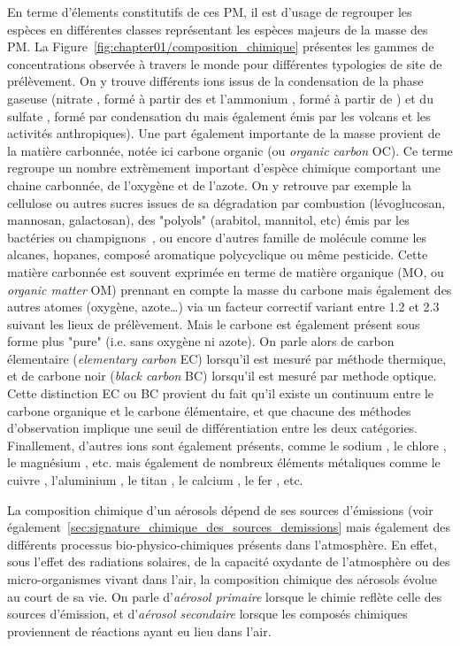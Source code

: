 En terme d'élements constitutifs de ces PM, il est d'usage de regrouper les espèces en
différentes classes représentant les espèces majeurs de la masse des PM. La
Figure~\ref{fig:chapter01/composition_chimique} présentes les gammes de concentrations
observée à travers le monde pour différentes typologies de site de prélèvement.
On y trouve différents ions issus de la condensation de la phase gaseuse (nitrate \NOt, formé à
partir des  et l'ammonium , formé à partir de ) et du sulfate
\SOq, formé par condensation du  mais également émis par les volcans et les
activités anthropiques).
Une part également importante de la masse provient de la matière carbonnée, notée ici
carbone organic (ou \textit{organic carbon} OC). Ce terme regroupe un nombre extrèmement
important d'espèce chimique comportant une chaine carbonnée, de l'oxygène et
de l'azote. On y retrouve par exemple la cellulose ou autres sucres issues de sa
dégradation par combustion (lévoglucosan, mannosan, galactosan), des "polyols" (arabitol,
mannitol, etc) émis par les bactéries ou champignons~\autocite{samakePolyols2019}, ou encore
d'autres famille de molécule comme les alcanes, hopanes, composé aromatique polycyclique
ou même pesticide. Cette matière carbonnée est souvent exprimée en terme de matière
organique (MO, ou \textit{organic matter} OM) prennant en compte la masse du carbone mais
également des autres atomes (oxygène, azote…) via un facteur correctif variant entre 1.2
et 2.3 suivant les lieux de prélèvement.
Mais le carbone est également présent sous forme plus "pure" (i.e. sans oxygène ni azote).
On parle alors de carbon élementaire (\textit{elementary carbon} EC) lorsqu'il est mesuré
par méthode thermique, et de carbone noir (\textit{black carbon} BC) lorsqu'il est mesuré
par methode optique. Cette distinction EC ou BC provient du fait qu'il existe un continuum
entre le carbone organique et le carbone élémentaire, et que chacune des méthodes
d'observation implique une seuil de différentiation entre les deux catégories.
Finallement, d'autres ions sont également présents, comme le sodium , le chlore
, le magnésium , etc. mais également de nombreux éléments métaliques
comme le cuivre , l'aluminium , le titan , le calcium , le fer
, etc.

La composition chimique d'un aérosols dépend de ses sources d'émissions (voir
également~\ref{sec:signature_chimique_des_sources_demissions} mais également des
différents processus bio-physico-chimiques présents dans l'atmosphère. En effet, sous
l'effet des radiations solaires, de la capacité oxydante de l'atmosphère ou des
micro-organismes vivant dans l'air, la composition chimique des aérosols évolue au court
de sa vie. On parle d'\textit{aérosol primaire} lorsque le chimie reflète celle des sources
d'émission, et d'\textit{aérosol secondaire} lorsque les composés chimiques proviennent de
réactions ayant eu lieu dans l'air.

